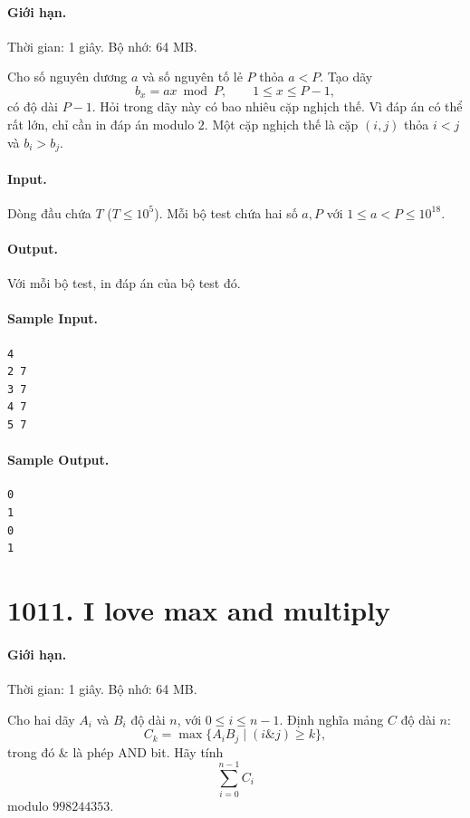 \documentclass[11pt]{article}
\begin{document}
\paragraph{Giới hạn.} Thời gian: 1 giây. Bộ nhớ: 64 MB.

Cho số nguyên dương $a$ và số nguyên tố lẻ $P$ thỏa $a<P$.  Tạo dãy
\[
  b_x=ax\bmod P,\qquad 1\le x\le P-1,
\]
có độ dài $P-1$.  Hỏi trong dãy này có bao nhiêu cặp nghịch thế.  Vì đáp án có
thể rất lớn, chỉ cần in đáp án modulo $2$.  Một cặp nghịch thế là cặp
$(i,j)$ thỏa $i<j$ và $b_i>b_j$.

\paragraph{Input.}
Dòng đầu chứa $T$ ($T\le 10^5$).  Mỗi bộ test chứa hai số $a,P$ với
$1\le a<P\le 10^{18}$.

\paragraph{Output.}
Với mỗi bộ test, in đáp án của bộ test đó.

\paragraph{Sample Input.}
\begin{verbatim}
4
2 7
3 7
4 7
5 7
\end{verbatim}

\paragraph{Sample Output.}
\begin{verbatim}
0
1
0
1
\end{verbatim}

\section{1011. I love max and multiply}

\paragraph{Giới hạn.} Thời gian: 1 giây. Bộ nhớ: 64 MB.

Cho hai dãy $A_i$ và $B_i$ độ dài $n$, với $0\le i\le n-1$.  Định nghĩa mảng
$C$ độ dài $n$:
\[
  C_k=\max\{A_iB_j\mid (i\mathbin{\&}j)\ge k\},
\]
trong đó $\&$ là phép AND bit.  Hãy tính
\[
  \sum_{i=0}^{n-1} C_i
\]
modulo $998244353$.
\end{document}
